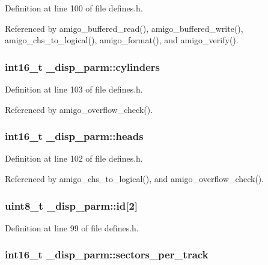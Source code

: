 Definition at line 100 of file defines.\-h.



Referenced by amigo\-\_\-buffered\-\_\-read(), amigo\-\_\-buffered\-\_\-write(), amigo\-\_\-chs\-\_\-to\-\_\-logical(), amigo\-\_\-format(), and amigo\-\_\-verify().

\hypertarget{struct__disp__parm_ac4687d407f95a65e86313cde433832a4}{
\subsubsection[{cylinders}]{\setlength{\rightskip}{0pt plus 5cm}int16\-\_\-t \-\_\-disp\-\_\-parm\-::cylinders}}\label{struct__disp__parm_ac4687d407f95a65e86313cde433832a4}


Definition at line 103 of file defines.\-h.



Referenced by amigo\-\_\-overflow\-\_\-check().

\hypertarget{struct__disp__parm_a013e3f25cec51e3edfae124ed5d22cb9}{
\subsubsection[{heads}]{\setlength{\rightskip}{0pt plus 5cm}int16\-\_\-t \-\_\-disp\-\_\-parm\-::heads}}\label{struct__disp__parm_a013e3f25cec51e3edfae124ed5d22cb9}


Definition at line 102 of file defines.\-h.



Referenced by amigo\-\_\-chs\-\_\-to\-\_\-logical(), and amigo\-\_\-overflow\-\_\-check().

\hypertarget{struct__disp__parm_adc781d8c48b2aa39c092fcb206f15e8c}{
\subsubsection[{id}]{\setlength{\rightskip}{0pt plus 5cm}uint8\-\_\-t \-\_\-disp\-\_\-parm\-::id\mbox{[}2\mbox{]}}}\label{struct__disp__parm_adc781d8c48b2aa39c092fcb206f15e8c}


Definition at line 99 of file defines.\-h.

\hypertarget{struct__disp__parm_a870887d0582245d0c35f34724180463c}{
\subsubsection[{sectors\-\_\-per\-\_\-track}]{\setlength{\rightskip}{0pt plus 5cm}int16\-\_\-t \-\_\-disp\-\_\-parm\-::sectors\-\_\-per\-\_\-track}}\label{struct__disp__parm_a870887d0582245d0c35f34724180463c}


